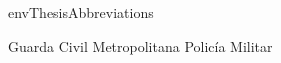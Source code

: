\startenvironment envThesisAbbreviations

 {Guarda Civil Metropolitana}
 {Policía Militar}

\stopenvironment